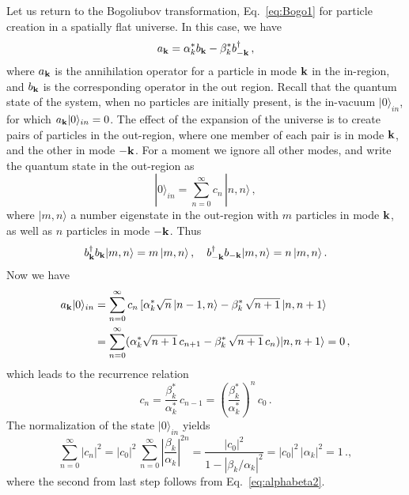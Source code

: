 \documentclass[12pt,onecolumn,eqsecnum,floats,aps,prd,floatfix,titlepage,tightenlines]{revtex4-2}
\begin{document}
Let us return to the Bogoliubov transformation, Eq.~\eqref{eq:Bogo1} for particle creation in a spatially flat universe. In
this case, we have 
\begin{equation}
a_{\bf k}= \alpha _{k}^* b_{\bf k}     - \beta _{k}^*  b_{\bf -k}^\dagger \,,
                                      \label{eq:Bogo-flat}
\end{equation}
where $a_{\bf k}$ is the annihilation operator for a particle in mode ${\bf k}$   in the in-region, and $b_{\bf k}$ is the
corresponding operator in the out region. Recall that the quantum state of the system, when no particles are initially
present, is the in-vacuum $|0\rangle_{in}$, for which $a_{\bf k} |0\rangle_{in}=0$. The effect of the expansion of the universe
is to create pairs of particles in the out-region, where one member of each pair is in mode ${\bf k}$, and the other in
mode ${\bf - k}$. For a moment we ignore all other modes, and write the quantum state in the out-region as
 \begin{equation}
 |0\rangle_{in}= \sum_{n=0}^\infty c_n\, |n,n \rangle \, ,
 \end{equation}
where  $|m,n\rangle$  a number eigenstate in the out-region with $m$ particles in mode ${\bf k}$, as well as $n$ particles in mode ${\bf -k}$.
Thus
\begin{equation}
  b_{\bf k}^\dagger b_{\bf k} |m,n\rangle =   m\,   |m,n\rangle \,,  \quad b_{\bf -k}^\dagger b_{\bf -k} |m,n\rangle  = n \,  |m,n\rangle \,.
 \end{equation}
Now we have
 \begin{equation}
 \begin{aligned}
 a_{\bf k}|0\rangle_{in}&=  \sum_{n=0}^\infty    c_n \,[  \alpha _{k}^* \sqrt{n}\,  |n-1,n \rangle -  \beta _{k}^*\, \sqrt{n+1}\, |n,n+1 \rangle \\
& = \sum_{n=0}^\infty   ( \alpha _{k}^* \sqrt{n+1}\, c_{n+1} - \beta _{k}^*\, \sqrt{n+1}\, c_n)  |n,n+1 \rangle  = 0\, ,
\end{aligned}
 \end{equation}
which leads to the recurrence relation
 \begin{equation}
 c_{n} = \frac{\beta _{k}^*}{\alpha _{k}^*} \, c_{n-1} = \left(\frac{\beta _{k}^*}{\alpha _{k}^*}  \right)^n \, c_0 \,.
 \end{equation}
The normalization of the state $ |0\rangle_{in}$ yields
\begin{equation}
 \sum_{n=0}^\infty |c_n|^2 = |c_0|^2 \,  \sum_{n=0}^\infty \left|  \frac{\beta _{k}}{\alpha _{k}} \right|^{2n} = \frac{ |c_0|^2 }{1- |\beta _{k}/\alpha _{k}|^2} =  |c_0|^2 \,|\alpha _{k}|^2  =1  \,.,
  \end{equation}
where the second from last step follows from Eq.~\eqref{eq:alphabeta2}. 
\end{document}
